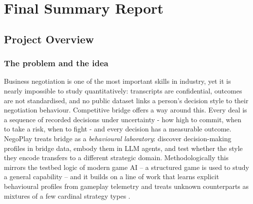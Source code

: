 \documentclass[11pt, a4paper, oneside, openany]{report}
\begin{document}
\makeatletter
\let\nl@orig\numberline
\renewcommand{\numberline}[1]{\def\nl@tmp{#1}\ifx\nl@tmp\@empty\else\nl@orig{#1}\fi}
\makeatother
\clearpage
\tableofcontents
\clearpage

\part{Final Summary Report}

\chapter{Project Overview}

\section{The problem and the idea}
Business negotiation is one of the most important skills in industry, yet
it is nearly impossible to study quantitatively: transcripts are confidential,
outcomes are not standardised, and no public dataset links a person's
decision style to their negotiation behaviour. Competitive bridge offers a
way around this. Every deal is a sequence of recorded decisions under
uncertainty - how high to commit, when to take a risk, when to fight -
and every decision has a measurable outcome. NegoPlay treats bridge as a
\emph{behavioural laboratory}: discover decision-making profiles in bridge
data, embody them in LLM agents, and test whether the style they encode
transfers to a different strategic domain. Methodologically this mirrors the
testbed logic of modern game AI \cite{silver2017} -- a structured game is used
to study a general capability -- and it builds on a line of work that learns
explicit behavioural profiles from gameplay telemetry \cite{talwadker2022} and
treats unknown counterparts as mixtures of a few cardinal strategy types
\cite{lockett2007}.
\end{document}
